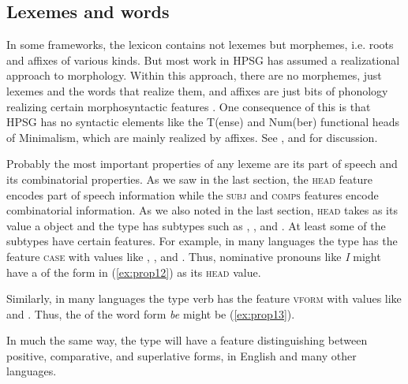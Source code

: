 \documentclass[output=paper
	        ,collection
	        ,collectionchapter
 	        ,biblatex
                ,babelshorthands
                ,newtxmath
                ,draftmode
                ,colorlinks, citecolor=brown
]{langscibook}
\begin{document}
\subsection{Lexemes and words}\label{sec:prop4.1}

In some frameworks, the lexicon contains not lexemes but morphemes, i.e. roots and affixes of various kinds. But most work in HPSG has assumed a realizational approach to morphology. Within this approach, there are no morphemes, just lexemes and the words that realize them, and affixes are just bits of phonology realizing certain morphosyntactic features \citep{Stump2001a-u-kopiert,Anderson92a-u}. One consequence of this is that HPSG has no syntactic elements like the T(ense) and Num(ber) functional heads of Minimalism\indexmp, which are mainly realized by affixes. See , \addpages and  for discussion.

Probably the most important properties of any lexeme are its part of speech and its combinatorial properties. As we saw in the last section, the \textsc{head} feature encodes part of speech information while the \textsc{subj} and \textsc{comps} features encode combinatorial information. As we also noted in the last section, \textsc{head} takes as its value a  object and the type  has subtypes such as , , and . At least some of the subtypes have certain features. For example, in many languages the type  has the feature \textsc{case} with values like , , and . Thus, nominative pronouns like \emph{I} might have a  of the form in (\ref{ex:prop12}) as its \textsc{head} value.

\ea\label{ex:prop12}
\z

Similarly, in many languages the type verb has the feature \textsc{vform} with values like  and . Thus, the  of the word form \emph{be} might be (\ref{ex:prop13}).

\ea\label{ex:prop13}
\z

In much the same way, the type  will have a feature distinguishing between positive, comparative, and superlative forms, in English and many other languages.
\end{document}
